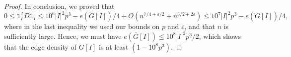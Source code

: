 \documentclass[10pt,a4paper]{amsart}
\newcommand{\eps}{\varepsilon}
\begin{document}
\begin{proof}
In conclusion, we proved that 
$$0\leq \mathds{1}^T_I D\mathds{1}_I\leq 10^6|I|^2p^3-e(\overline{G}[I])/4+O(n^{7/4+\eps/2}+n^{3/2+2\eps})\leq 10^7|I|^2p^3-e(\overline{G}[I])/4,$$
where in the last inequality we used our bounds on $p$ and $\eps$, and that $n$ is sufficiently large. Hence, we must have $e(\overline{G}[I])\leq 10^8 |I|^2p^3/2$, which shows that the edge density of $G[I]$ is at least $(1-10^8p^3)$.
\end{proof}
\end{document}
